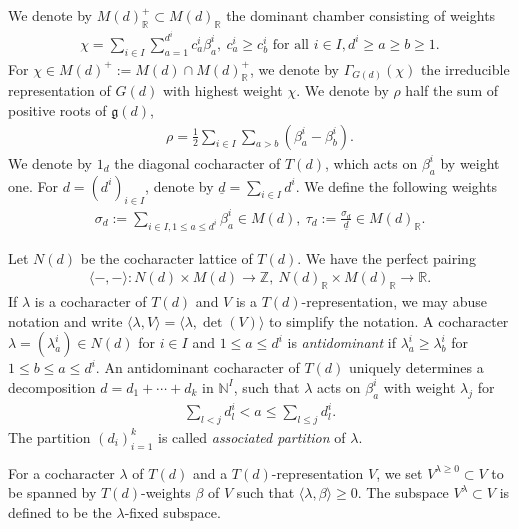 \documentclass [11pt,oneside,a4paper,mathscr]{amsart}
\theoremstyle{definition}
\renewcommand{\leq}{\leqslant}
\renewcommand{\geq}{\geqslant}
\newcommand{\dd}{\underline{d}}
\begin{document}
We denote by $M(d)_\mathbb{R}^+\subset M(d)_\mathbb{R}$
the dominant chamber consisting of weights 
\begin{align*}\chi=\sum_{i\in I}\sum_{a=1}^{d^i}c^i_a\beta^i_a, \ c^i_a\geq c^i_b \mbox{ for all }i\in I, d^i\geq a\geq b\geq 1.
\end{align*}
For $\chi \in M(d)^+:=M(d) \cap M(d)_{\mathbb{R}}^+$, we denote by $\Gamma_{G(d)}(\chi)$ the irreducible 
representation of $G(d)$ with highest weight $\chi$. 
We denote by $\rho$ half the sum of positive roots of $\mathfrak{g}(d)$, 
\begin{align*}
    \rho=\frac{1}{2}\sum_{i\in I} \sum_{a>b} (\beta_a^i-\beta_b^i). 
\end{align*}
We denote by $1_d$ the diagonal cocharacter of $T(d)$, which 
acts on $\beta_a^i$ by weight one. 
For $d=(d^i)_{i\in I}$,
denote by $\underline{d}=\sum_{i\in I}d^i$. We define the following weights
\begin{align*}
    \sigma_{d}:=\sum_{i\in I, 1\leq a\leq d^i}\beta^i_a\in M(d), \ 
    \tau_d:=\frac{\sigma_d}{\dd}\in M(d)_\mathbb{R}.
\end{align*}

Let $N(d)$ be the cocharacter lattice of $T(d)$. 
We have the perfect pairing 
\begin{align*}
    \langle -, - \rangle \colon 
    N(d) \times M(d) \to \mathbb{Z}, \ 
    N(d)_{\mathbb{R}} \times M(d)_{\mathbb{R}} \to \mathbb{R}. 
\end{align*}
If $\lambda$ is a cocharacter of $T(d)$ and $V$ is a $T(d)$-representation, we may abuse notation and write
$\langle \lambda, V\rangle=\langle \lambda, \det(V)\rangle$
to simplify the notation.
A cocharacter $\lambda=(\lambda_a^i) \in N(d)$
for $i \in I$ and $1\leq a\leq d^i$ is \textit{antidominant} 
if $\lambda_a^i \geq \lambda_b^i$ for $1\leq b\leq a \leq d^i$. 
An antidominant cocharacter of $T(d)$ uniquely 
determines a decomposition $d=d_1+\cdots+d_k$ 
in $\mathbb{N}^I$, 
such that $\lambda$ acts on $\beta_a^i$ with weight 
$\lambda_j$ for \begin{align*}\sum_{l<j} d_l^i <a \leq \sum_{l\leq j} d_l^i.\end{align*}
The partition $(d_i)_{i=1}^k$ is called \textit{associated 
partition} of $\lambda$. 


 For a cocharacter $\lambda$ of $T(d)$ and a 
 $T(d)$-representation $V$, we set
 $V^{\lambda \geq 0} \subset V$ to be 
 spanned by $T(d)$-weights $\beta$
 of $V$ such that $\langle \lambda, \beta \rangle \geq 0$. 
 The subspace $V^{\lambda} \subset V$ is defined 
 to be the $\lambda$-fixed subspace. 
\end{document}
